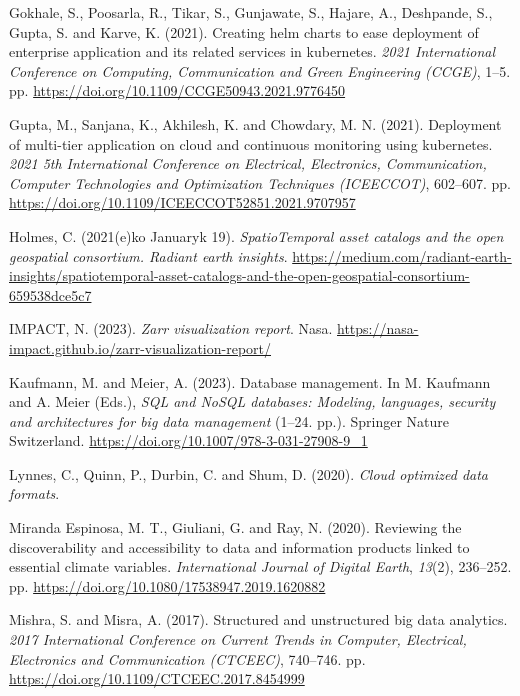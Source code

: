 \documentclass[
  oneside,
  open=any]{scrbook}
\newlength{\cslhangindent}
\newenvironment{CSLReferences}[2] %
 {\begin{list}{}{%
  \setlength{\itemindent}{0pt}
  \setlength{\leftmargin}{0pt}
  \setlength{\parsep}{0pt}
  \ifodd #1
   \setlength{\leftmargin}{\cslhangindent}
   \setlength{\itemindent}{-1\cslhangindent}
  \fi
  \setlength{\itemsep}{#2\baselineskip}}}
 {\end{list}}
\begin{document}
\begin{CSLReferences}{1}{0}
Gokhale, S., Poosarla, R., Tikar, S., Gunjawate, S., Hajare, A.,
Deshpande, S., Gupta, S. and Karve, K. (2021). Creating helm charts to
ease deployment of enterprise application and its related services in
kubernetes. \emph{2021 International Conference on Computing,
Communication and Green Engineering ({CCGE})}, 1--5. pp.
\url{https://doi.org/10.1109/CCGE50943.2021.9776450}

Gupta, M., Sanjana, K., Akhilesh, K. and Chowdary, M. N. (2021).
Deployment of multi-tier application on cloud and continuous monitoring
using kubernetes. \emph{2021 5th International Conference on Electrical,
Electronics, Communication, Computer Technologies and Optimization
Techniques ({ICEECCOT})}, 602--607. pp.
\url{https://doi.org/10.1109/ICEECCOT52851.2021.9707957}

Holmes, C. (2021(e)ko Januaryk 19). \emph{{SpatioTemporal} asset
catalogs and the open geospatial consortium. Radiant earth insights}.
\url{https://medium.com/radiant-earth-insights/spatiotemporal-asset-catalogs-and-the-open-geospatial-consortium-659538dce5c7}

IMPACT, N. (2023). \emph{Zarr visualization report}. Nasa.
\url{https://nasa-impact.github.io/zarr-visualization-report/}

Kaufmann, M. and Meier, A. (2023). Database management. In M. Kaufmann
and A. Meier (Eds.), \emph{{SQL} and {NoSQL} databases: Modeling,
languages, security and architectures for big data management} (1--24.
pp.). Springer Nature Switzerland.
\url{https://doi.org/10.1007/978-3-031-27908-9_1}

Lynnes, C., Quinn, P., Durbin, C. and Shum, D. (2020). \emph{Cloud
optimized data formats}.

Miranda Espinosa, M. T., Giuliani, G. and Ray, N. (2020). Reviewing the
discoverability and accessibility to data and information products
linked to essential climate variables. \emph{International Journal of
Digital Earth}, \emph{13}(2), 236--252. pp.
\url{https://doi.org/10.1080/17538947.2019.1620882}

Mishra, S. and Misra, A. (2017). Structured and unstructured big data
analytics. \emph{2017 International Conference on Current Trends in
Computer, Electrical, Electronics and Communication ({CTCEEC})},
740--746. pp. \url{https://doi.org/10.1109/CTCEEC.2017.8454999}


\end{CSLReferences}
\end{document}
